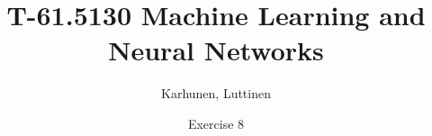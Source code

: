 
\title{T-61.5130 Machine Learning and Neural Networks}
\author{Karhunen, Luttinen}
\date{Exercise 8}

\newcommand{\vect}[1]{{\bf{#1}}}
\newcommand{\svect}[1]{\boldsymbol{#1}}
\newcommand{\matr}[1]{\boldsymbol{#1}}

\renewcommand{\vec}[1]{\mathbf{#1}}
\newcommand{\set}[1]{\mathcal{#1}}
\newcommand{\C}{\set{C}}
\newcommand{\E}{\mathcal{E}}
\newcommand{\I}{\vec{I}}
\renewcommand{\L}{\mathcal{L}}
\newcommand{\N}{\mathrm{I \negmedspace N}}
\newcommand{\R}{\mathrm{I \negmedspace R}}
\newcommand{\V}{\set{V}}
\newcommand{\W}{\vec{W}}
\newcommand{\X}{\set{X}}
\newcommand{\e}{\vec{e}}
\newcommand{\h}{\vec{h}}
\newcommand{\m}{\vec{m}}
\newcommand{\mub}{\boldsymbol{\mu}}
\newcommand{\n}{\vec{n}}
\renewcommand{\t}{\vec{t}}
\renewcommand{\u}{\vec{u}}
\renewcommand{\v}{\vec{v}}
\newcommand{\w}{\vec{w}}
\newcommand{\x}{\vec{x}}
\newcommand{\y}{\vec{y}}
\newcommand{\Y}{\vec{Y}}
\newcommand{\z}{\vec{z}}
\newcommand{\argmin}{\operatornamewithlimits{argmin}}
\newcommand{\argmax}{\operatornamewithlimits{argmax}}




\maketitle
\thispagestyle{empty}

